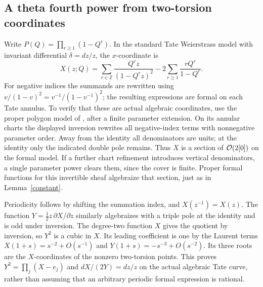 \documentclass[11pt]{article}
\theoremstyle{remark}\newtheorem{remark}[theorem]{Remark}
\newcommand{\Z}{\mathbb Z}\newcommand{\Q}{\mathbb Q}
\begin{document}
\subsection{A theta fourth power from two-torsion coordinates}
Write $P(Q)=\prod_{r\geq1}(1-Q^r)$. In the standard Tate Weierstrass
model with invariant differential $\delta=dz/z$, the $x$-coordinate is
\[
 X(z;Q)=\sum_{r\in\Z}\frac{Q^rz}{(1-Q^rz)^2}
       -2\sum_{r\geq1}\frac{rQ^r}{1-Q^r}.
\]
For negative indices the summands are rewritten using
$v/(1-v)^2=v^{-1}/(1-v^{-1})^2$; the resulting expressions are formal
on each Tate annulus. To verify that these are actual algebraic coordinates,
use the proper polygon model of \cite[Section 2.5]{conrad}, after a finite
parameter extension. On its annular charts the displayed inversion rewrites
all negative-index terms with nonnegative parameter order. Away from the
identity all denominators are units; at the identity only the indicated
double pole remains. Thus $X$ is a section of
$\mathcal O(2[0])$ on the formal model. If a further chart refinement introduces
vertical denominators, a single parameter power clears them, since the
cover is finite. Proper formal functions for this invertible sheaf
algebraize that section, just as in Lemma~\ref{constant}.

Periodicity follows by shifting the summation index, and
$X(z^{-1})=X(z)$. The function $Y=\tfrac12z\,\partial X/\partial z$
similarly algebraizes with a triple pole at the identity and is odd under
inversion. The degree-two function $X$ gives the quotient by inversion,
so $Y^2$ is a cubic in $X$. Its leading coefficient is one by the Laurent
terms $X(1+s)=s^{-2}+O(s^{-1})$ and
$Y(1+s)=-s^{-3}+O(s^{-2})$. Its three roots are the $X$-coordinates
of the nonzero two-torsion points. This proves
$Y^2=\prod_j(X-e_j)$ and $dX/(2Y)=dz/z$ on the actual algebraic
Tate curve, rather than assuming that an arbitrary periodic formal
expression is rational.
\end{document}
